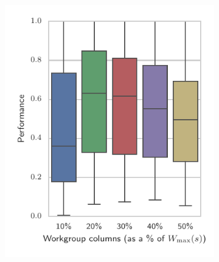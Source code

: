 \documentclass[nonatbib,preprint,nocopyrightspace,9pt]{sigplanconf}
\begin{document}
\begin{figure}
\begin{subfigure}[h]{.48\columnwidth}
    \includegraphics[width=\columnwidth]{img/performance_max_c}
    \vspace{-1.5em} %
    \caption{}
    \label{fig:performance-wg-c}
  \end{subfigure}
  ~%
  \begin{subfigure}[h]{.48\columnwidth}
    \centering

\end{subfigure}
\end{figure}
\end{document}
